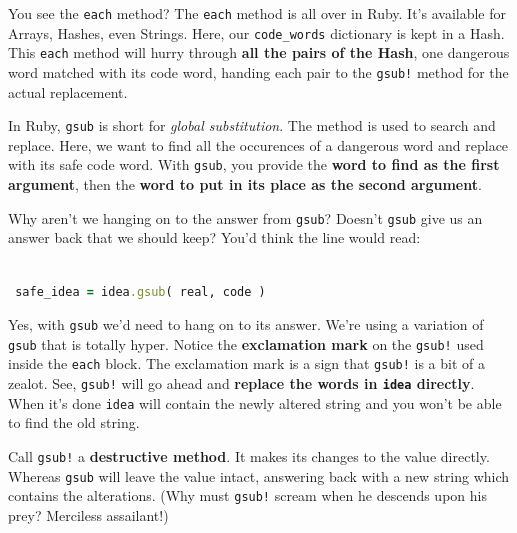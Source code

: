 \documentclass[10pt,twoside]{report}
\begin{document}
You see the \lstinline[breaklines=true]|each| method?  The
\lstinline[breaklines=true]|each| method is all over in Ruby.  It's
available for Arrays, Hashes, even Strings.  Here, our
\lstinline[breaklines=true]|code_words| dictionary is kept in a Hash.
This \lstinline[breaklines=true]|each| method will hurry through {\bf
  all the pairs of the Hash}, one dangerous word matched with its code
word, handing each pair to the \lstinline[breaklines=true]|gsub!|
method for the actual replacement.

In Ruby, \lstinline[breaklines=true]|gsub| is short for {\em global
  substitution}.  The method is used to search and replace. Here, we
want to find all the occurences of a dangerous word and replace with
its safe code word.  With \lstinline[breaklines=true]|gsub|, you
provide the {\bf word to find as the first argument}, then the {\bf
  word to put in its place as the second argument}.

Why aren't we hanging on to the answer from
\lstinline[breaklines=true]|gsub|?  Doesn't
\lstinline[breaklines=true]|gsub| give us an answer back that we
should keep?  You'd think the line would read:


\begin{lstlisting}[basicstyle=\ttfamily\color{basiccolor},
    commentstyle = \ttfamily\color{commentcolor},
    keywordstyle=\ttfamily\color{keywordscolor},
    stringstyle=\color{stringcolor},
    language=Ruby,
    basicstyle=\small\ttfamily,
    showstringspaces=false,
  ]

 safe_idea = idea.gsub( real, code )

\end{lstlisting}


Yes, with \lstinline[breaklines=true]|gsub| we'd need to hang on to
its answer.  We're using a variation of
\lstinline[breaklines=true]|gsub| that is totally hyper.  Notice the
{\bf exclamation mark} on the \lstinline[breaklines=true]|gsub!| used
inside the \lstinline[breaklines=true]|each| block.  The exclamation
mark is a sign that \lstinline[breaklines=true]|gsub!| is a bit of a
zealot.  See, \lstinline[breaklines=true]|gsub!| will go ahead and
{\bf replace the words in \lstinline[breaklines=true]|idea| directly}.
When it's done \lstinline[breaklines=true]|idea| will contain the
newly altered string and you won't be able to find the old string.

Call \lstinline[breaklines=true]|gsub!| a {\bf destructive method}.
It makes its changes to the value directly.  Whereas
\lstinline[breaklines=true]|gsub| will leave the value intact,
answering back with a new string which contains the alterations. (Why
must \lstinline[breaklines=true]|gsub!| scream when he descends upon
his prey?  Merciless assailant!)
\end{document}
